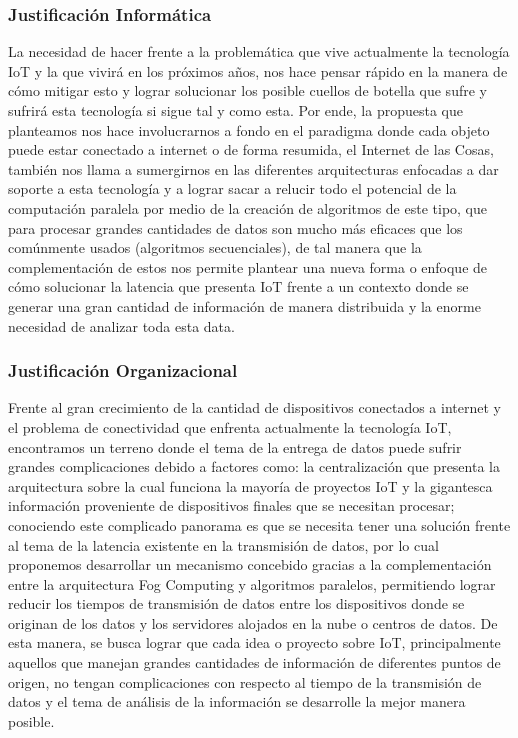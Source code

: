         \subsubsection{Justificación Informática}
            La necesidad de hacer frente a la problemática que vive actualmente la tecnología IoT y la que vivirá en los próximos años, nos hace pensar rápido en la manera de cómo mitigar esto y lograr solucionar los posible cuellos de botella que sufre y sufrirá esta tecnología si sigue tal y como esta. Por ende, la propuesta que planteamos nos hace involucrarnos a fondo en el paradigma donde cada objeto puede estar conectado a internet o de forma resumida, el Internet de las Cosas, también nos llama a sumergirnos en las diferentes arquitecturas enfocadas a dar soporte a esta tecnología y a lograr sacar a relucir todo el potencial de la computación paralela por medio de la creación de algoritmos de este tipo, que para procesar grandes cantidades de datos son mucho más eficaces que los comúnmente usados (algoritmos secuenciales), de tal manera que la complementación de estos nos permite plantear una nueva forma o enfoque de cómo solucionar la latencia que presenta IoT frente a un contexto donde se generar una gran cantidad de información de manera distribuida y la enorme necesidad de analizar toda esta data.
        \subsubsection{Justificación Organizacional}
            Frente al gran crecimiento de la cantidad de dispositivos conectados a internet y el problema de conectividad que enfrenta actualmente la tecnología IoT, encontramos un terreno donde el tema de la entrega de datos puede sufrir grandes complicaciones debido a factores como: la centralización que presenta la arquitectura sobre la cual funciona la mayoría de proyectos IoT y la gigantesca información proveniente de dispositivos finales que se necesitan procesar; conociendo este complicado panorama es que se necesita tener una solución frente al tema de la latencia existente en la transmisión de datos, por lo cual proponemos desarrollar un mecanismo concebido gracias a la complementación entre la arquitectura Fog Computing y algoritmos paralelos, permitiendo lograr reducir los tiempos de transmisión de datos entre los dispositivos donde se originan de los datos y los servidores alojados en la nube o centros de datos. De esta manera, se busca lograr que cada idea o proyecto sobre IoT, principalmente aquellos que manejan grandes cantidades de información de diferentes puntos de origen, no tengan complicaciones con respecto al tiempo de la transmisión de datos y el tema de análisis de la información se desarrolle la mejor manera posible.
